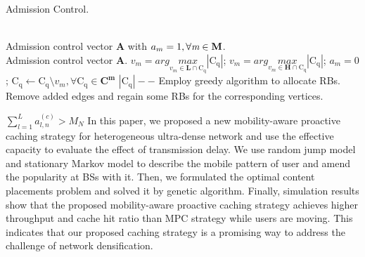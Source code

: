\documentclass[conference]{IEEEtran}
\begin{document}
\begin{algorithm}[htb]
 \caption{Admission Control.}
 \label{alg:admission}
 \begin{algorithmic}[1] %
  \REQUIRE ~~\\ %
  Admission control vector $\mathbf{A}$ with $a_m=1, \forall \emph{m}\in \mathbf{M}$.
  \ENSURE ~~\\ %
  Admission control vector $\mathbf{A}$.
  \STATE $v_m=arg \underset{v_m\in \mathbf{L}\cap\mathrm{C_q}}{max} \left|\mathrm{C_q}\right|$;
  \ELSE
  \STATE $v_m=arg \underset{v_m\in \mathbf{H}\cap\mathrm{C_q}}{max} \left|\mathrm{C_q}\right|$;
  \ENDIF
  \STATE $a_m=0$;
  \STATE $\mathrm{C_q}\leftarrow \mathrm{C_q}\setminus v_m, \forall\mathrm{C_q}\in\mathbf{C^m}$
  \STATE $\left|\mathrm{C_q}\right|--$
  \ENDWHILE
  \STATE Employ greedy algorithm to allocate RBs.
  \ENDFOR
  \STATE Remove added edges and regain some RBs for the corresponding vertices.
 \end{algorithmic}
\end{algorithm}
$\sum_{l=1}^L a_{l,n}^{(c)}>M_N$
In this paper, we proposed a new mobility-aware proactive caching strategy for heterogeneous ultra-dense network and use the effective capacity to evaluate the effect of transmission delay. We use random jump model and stationary Markov model to describe the mobile pattern of user and amend the popularity at BSs with it. Then, we formulated the optimal content placements problem and solved it by genetic algorithm. Finally, simulation results show that the proposed mobility-aware proactive caching strategy achieves higher throughput and cache hit ratio than MPC strategy while users are moving. This indicates that our proposed caching strategy is a promising way to address the challenge of network densification.


\end{document}
